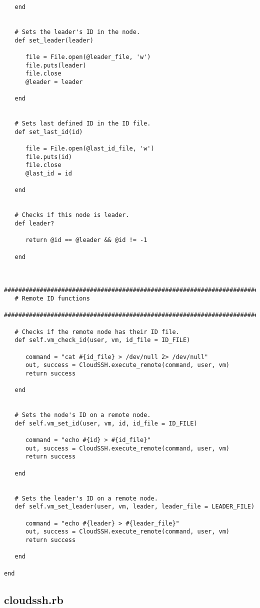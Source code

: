 \begin{lstlisting}
   end
   
   
   # Sets the leader's ID in the node.
   def set_leader(leader)
   
      file = File.open(@leader_file, 'w')
      file.puts(leader)
      file.close
      @leader = leader
      
   end
   
   
   # Sets last defined ID in the ID file.
   def set_last_id(id)

      file = File.open(@last_id_file, 'w')
      file.puts(id)
      file.close
      @last_id = id
      
   end
   
   
   # Checks if this node is leader.
   def leader?
      
      return @id == @leader && @id != -1
      
   end
   
   
   #############################################################################
   # Remote ID functions
   #############################################################################
   
   # Checks if the remote node has their ID file.
   def self.vm_check_id(user, vm, id_file = ID_FILE)
   
      command = "cat #{id_file} > /dev/null 2> /dev/null"
      out, success = CloudSSH.execute_remote(command, user, vm)
      return success
      
   end
   
   
   # Sets the node's ID on a remote node.
   def self.vm_set_id(user, vm, id, id_file = ID_FILE)
   
      command = "echo #{id} > #{id_file}"
      out, success = CloudSSH.execute_remote(command, user, vm)
      return success
      
   end


   # Sets the leader's ID on a remote node.
   def self.vm_set_leader(user, vm, leader, leader_file = LEADER_FILE)
   
      command = "echo #{leader} > #{leader_file}"
      out, success = CloudSSH.execute_remote(command, user, vm)
      return success
      
   end
   
end
\end{lstlisting}


\subsection{cloudssh.rb}


